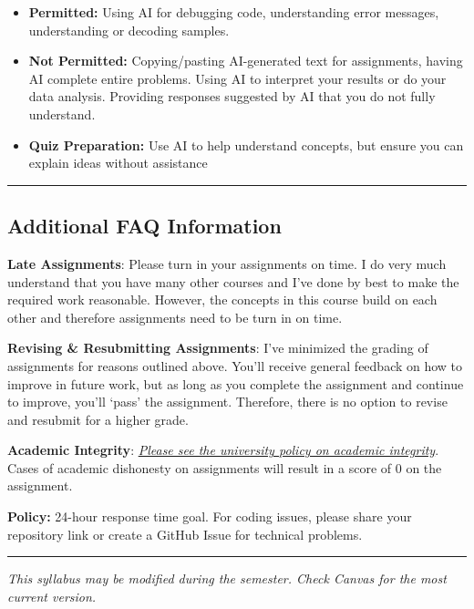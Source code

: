 \documentclass[
  11pt,
]{article}
\providecommand{\tightlist}{%
  \setlength{\itemsep}{0pt}\setlength{\parskip}{0pt}}
\begin{document}
\begin{itemize}
\tightlist
\item
  \textbf{Permitted:} Using AI for debugging code, understanding error
  messages, understanding or decoding samples.
\item
  \textbf{Not Permitted:} Copying/pasting AI-generated text for
  assignments, having AI complete entire problems. Using AI to interpret
  your results or do your data analysis. Providing responses suggested
  by AI that you do not fully understand.
\item
  \textbf{Quiz Preparation:} Use AI to help understand concepts, but
  ensure you can explain ideas without assistance
\end{itemize}

\begin{center}\rule{0.5\linewidth}{0.5pt}\end{center}

\subsection{Additional FAQ
Information}\label{additional-faq-information}

\textbf{Late Assignments}: Please turn in your assignments on time. I do
very much understand that you have many other courses and I've done by
best to make the required work reasonable. However, the concepts in this
course build on each other and therefore assignments need to be turn in
on time.

\textbf{Revising \& Resubmitting Assignments}: I've minimized the
grading of assignments for reasons outlined above. You'll receive
general feedback on how to improve in future work, but as long as you
complete the assignment and continue to improve, you'll `pass' the
assignment. Therefore, there is no option to revise and resubmit for a
higher grade.

\textbf{Academic Integrity}:
\href{https://catalog.upenn.edu/pennbook/code-of-academic-integrity/}{\emph{Please
see the university policy on academic integrity}}. Cases of academic
dishonesty on assignments will result in a score of 0 on the assignment.

\textbf{Policy:} 24-hour response time goal. For coding issues, please
share your repository link or create a GitHub Issue for technical
problems.

\begin{center}\rule{0.5\linewidth}{0.5pt}\end{center}

\emph{This syllabus may be modified during the semester. Check Canvas
for the most current version.}
\end{document}
